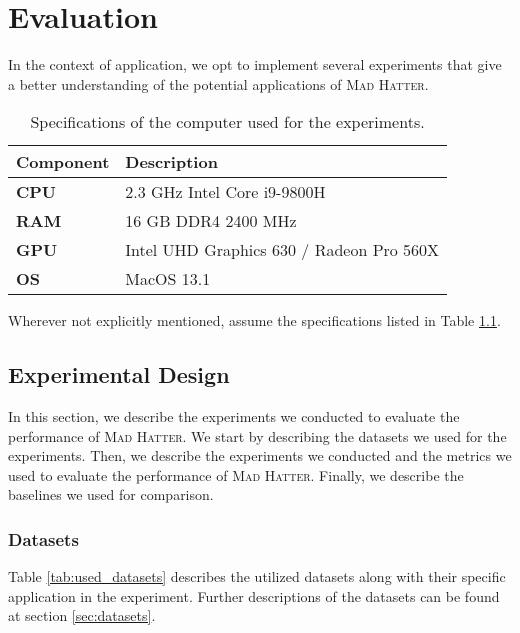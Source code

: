 \chapter{Evaluation}
\label{sec:evaluation}
In the context of application, we opt to implement several experiments that give a better understanding of the potential applications of \textsc{Mad Hatter}. 

\begin{table}[htbp]
    \centering
    \begin{tabular}{lp{}}
        \toprule
        \textbf{Component} & \textbf{Description} \\
        \midrule
        \textbf{CPU} & 2.3 GHz Intel Core i9-9800H \\
        \textbf{RAM} & 16 GB DDR4 2400 MHz \\
        \textbf{GPU} & Intel UHD Graphics 630 / Radeon Pro 560X  \\
        \textbf{OS} & MacOS 13.1\\
        \bottomrule
    \end{tabular}
    \caption{Specifications of the computer used for the experiments.}
    \label{tab:specs}
    
    
\end{table}
Wherever not explicitly mentioned, assume the specifications listed in Table \ref{tab:specs}.

\section{Experimental Design}
\label{sec:experimental_design}
In this section, we describe the experiments we conducted to evaluate the performance of \textsc{Mad Hatter}. We start by describing the datasets we used for the experiments. Then, we describe the experiments we conducted and the metrics we used to evaluate the performance of \textsc{Mad Hatter}. Finally, we describe the baselines we used for comparison.

\subsection{Datasets}
\label{sec:datasets_expdesign}
Table \ref{tab:used_datasets} describes the utilized datasets along with their specific application in the experiment. Further descriptions of the datasets can be found at section \ref{sec:datasets}.

